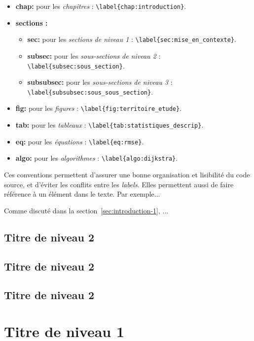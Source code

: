 \begin{itemize}
    \item \textbf{chap:} pour les \textit{chapitres} : \verb|\label{chap:introduction}|.
    \item \textbf{sections :}
    \begin{itemize}
        \item \textbf{sec:} pour les \textit{sections de niveau 1} : \verb|\label{sec:mise_en_contexte}|.
        \item \textbf{subsec:} pour les \textit{sous-sections de niveau 2} : \verb|\label{subsec:sous_section}|.
        \item \textbf{subsubsec:} pour les \textit{sous-sections de niveau 3} : 
        \lstinline|\label{subsubsec:sous_sous_section}|.
    \end{itemize}
    \item \textbf{fig:} pour les \textit{figures} : \verb|\label{fig:territoire_etude}|.
    \item \textbf{tab:} pour les \textit{tableaux} : \verb|\label{tab:statistiques_descrip}|.
    \item \textbf{eq:} pour les \textit{équations} : \verb|\label{eq:rmse}|.
    \item \textbf{algo:} pour les \textit{algorithmes} : \verb|\label{algo:dijkstra}|.
\end{itemize}

Ces conventions permettent d'assurer une bonne organisation et lisibilité du code source, et d'éviter les conflits entre les \textit{labels}. Elles permettent aussi de faire référence à un élément dans le texte. Par exemple...

Comme discuté dans la section~\ref{sec:introduction-1}, ...

\subsection{Titre de niveau 2} \label{sec:introduction-3-1}

\lipsum[1] %


\subsection{Titre de niveau 2} \label{sec:introduction-3-2}

\lipsum[1] %


\subsection{Titre de niveau 2} \label{sec:introduction-3-3}

\lipsum[1] %


\section{Titre de niveau 1} \label{sec:introduction-4}

\lipsum[1-2] %